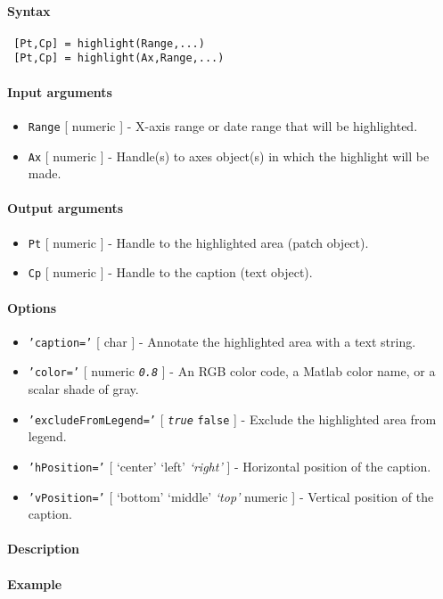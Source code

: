 


	\paragraph{Syntax}
 
 \begin{verbatim}
 [Pt,Cp] = highlight(Range,...)
 [Pt,Cp] = highlight(Ax,Range,...)
 \end{verbatim}
 
 \paragraph{Input arguments}
 
 \begin{itemize}
 \item
   \texttt{Range} {[} numeric {]} - X-axis range or date range that will
   be highlighted.
 \item
   \texttt{Ax} {[} numeric {]} - Handle(s) to axes object(s) in which the
   highlight will be made.
 \end{itemize}
 
 \paragraph{Output arguments}
 
 \begin{itemize}
 \item
   \texttt{Pt} {[} numeric {]} - Handle to the highlighted area (patch
   object).
 \item
   \texttt{Cp} {[} numeric {]} - Handle to the caption (text object).
 \end{itemize}
 
 \paragraph{Options}
 
 \begin{itemize}
 \item
   \texttt{'caption='} {[} char {]} - Annotate the highlighted area with
   a text string.
 \item
   \texttt{'color='} {[} numeric \textbar{} \emph{\texttt{0.8}} {]} - An
   RGB color code, a Matlab color name, or a scalar shade of gray.
 \item
   \texttt{'excludeFromLegend='} {[} \emph{\texttt{true}} \textbar{}
   \texttt{false} {]} - Exclude the highlighted area from legend.
 \item
   \texttt{'hPosition='} {[} `center' \textbar{} `left' \textbar{}
   \emph{`right'} {]} - Horizontal position of the caption.
 \item
   \texttt{'vPosition='} {[} `bottom' \textbar{} `middle' \textbar{}
   \emph{`top'} \textbar{} numeric {]} - Vertical position of the
   caption.
 \end{itemize}
 
 \paragraph{Description}
 
 \paragraph{Example}


